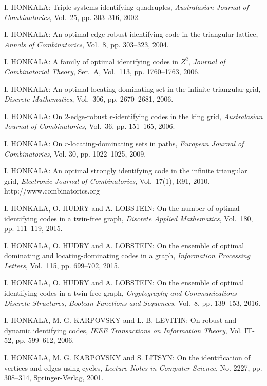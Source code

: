 \begin{thebibliography}{999}
I. HONKALA: Triple systems identifying quadruples, {\it Australasian Journal of Combinatorics}, Vol.~25, pp. 303--316, 2002.

I. HONKALA: An optimal edge-robust identifying code in the triangular lattice, {\it Annals of Combinatorics}, Vol.~8, pp. 303--323, 2004.

I. HONKALA: A family of optimal identifying codes in $Z^2$, {\it Journal of Combinatorial Theory}, Ser.~A, Vol.~113, pp. 1760--1763, 2006.

I. HONKALA: An optimal locating-dominating set in the infinite triangular grid, {\it Discrete Mathematics}, Vol.~306, pp. 2670--2681, 2006.

I. HONKALA: On 2-edge-robust $r$-identifying codes in the king grid, {\it Australasian Journal of Combinatorics}, Vol.~36, pp. 151--165, 2006.

I. HONKALA: On $r$-locating-dominating sets in paths, {\it European Journal of Combinatorics}, Vol. 30, pp. 1022--1025, 2009.

I. HONKALA: An optimal strongly identifying code in the infinite triangular grid, {\it Electronic Journal of Combinatorics}, Vol.~17(1), R91, 2010.\\
http://www.combinatorics.org

 I. HONKALA, O. HUDRY and A. LOBSTEIN: On the number of optimal identifying codes in a twin-free graph, {\it Discrete Applied Mathematics}, Vol.~180, pp. 111--119, 2015.

 I. HONKALA, O. HUDRY and A. LOBSTEIN: On the ensemble of optimal dominating and locating-dominating codes in a graph, {\it Information Processing Letters}, Vol.~115, pp. 699--702, 2015.

 I. HONKALA, O. HUDRY and A. LOBSTEIN: On the ensemble of optimal identifying codes in a twin-free graph, {\it Cryptography and Communications -- Discrete Structures, Boolean Functions and Sequences}, Vol.~8, pp. 139--153, 2016.

I. HONKALA, M. G. KARPOVSKY and L. B. LEVITIN: On robust and dynamic identifying codes, {\it IEEE Transactions on Information Theory}, Vol. IT-52, pp. 599--612, 2006.

I. HONKALA, M. G. KARPOVSKY and S. LITSYN: On the identification of vertices and edges using cycles, {\it Lecture Notes in Computer Science}, No. 2227, pp. 308--314, Springer-Verlag, 2001.


\end{thebibliography}
